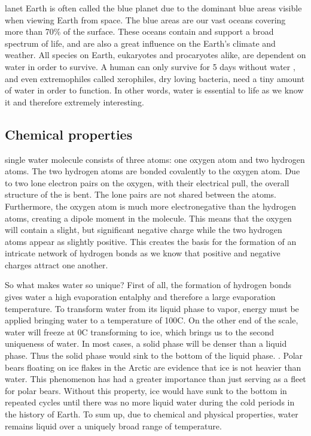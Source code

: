lanet Earth is often called the blue planet due to the dominant blue areas visible when viewing Earth from space.
The blue areas are our vast oceans covering more than 70\% \cite{WikiEarth} of the surface.
These oceans contain and support a broad spectrum of life, and are also a great influence on the Earth's climate and weather.
All species on Earth, eukaryotes and procaryotes alike, are dependent on water in order to survive.
A human can only survive for 5 days without water \cite{SurviveWater}, and even extremophiles called xerophiles, dry loving bacteria, need a tiny amount of water in order to function.
In other words, water is essential to life as we know it and therefore extremely interesting. 

\subsection{Chemical properties}
 single water molecule consists of three atoms: one oxygen atom and two hydrogen atoms.
The two hydrogen atoms are bonded covalently to the oxygen atom.
Due to two lone electron pairs on the oxygen, with their electrical pull, the overall structure of the is bent.
The lone pairs are not shared between the atoms.
Furthermore, the oxygen atom is much more electronegative than the hydrogen atoms, creating a dipole moment in the molecule.
This means that the oxygen will contain a slight, but significant negative charge while the two hydrogen atoms appear as slightly positive.
This creates the basis for the formation of an intricate network of hydrogen bonds as we know that positive and negative charges attract one another.

So what makes water so unique?
First of all, the formation of hydrogen bonds gives water a high evaporation entalphy and therefore a large evaporation temperature.
To transform water from its liquid phase to vapor, energy must be applied bringing water to a temperature of 100\degree C.
On the other end of the scale, water will freeze at 0\degree C transforming to ice, which brings us to the second uniqueness of water.
In most cases, a solid phase will be denser than a liquid phase.
Thus the solid phase would sink to the bottom of the liquid phase. \cite{SolidWater}.
Polar bears floating on ice flakes in the Arctic are evidence that ice is not heavier than water.
This phenomenon has had a greater importance than just serving as a fleet for polar bears.
Without this property, ice would have sunk to the bottom in repeated cycles until there was no more liquid water during the cold periods in the history of Earth.
To sum up, due to chemical and physical properties, water remains liquid over a uniquely broad range of temperature.

